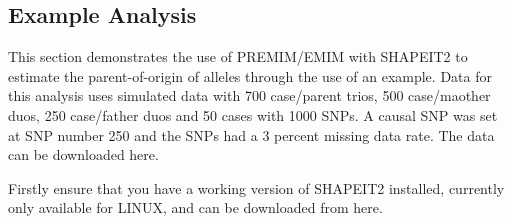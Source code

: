 \documentclass[a4paper,12pt]{article}
\begin{document}



\subsection{Example Analysis}
\label{poo-example}

This section demonstrates the use of PREMIM/EMIM with SHAPEIT2 to estimate the parent-of-origin of alleles through the use of an example. Data for this analysis uses simulated data with 700 case/parent trios, 500 case/maother duos, 250 case/father duos and 50 cases with 1000 SNPs. A causal SNP was set at SNP number 250 and the SNPs had a 3 percent missing data rate. The data can be downloaded here. 

Firstly ensure that you have a working version of SHAPEIT2 installed, currently only available for LINUX, and can be downloaded from here. 
\end{document}
